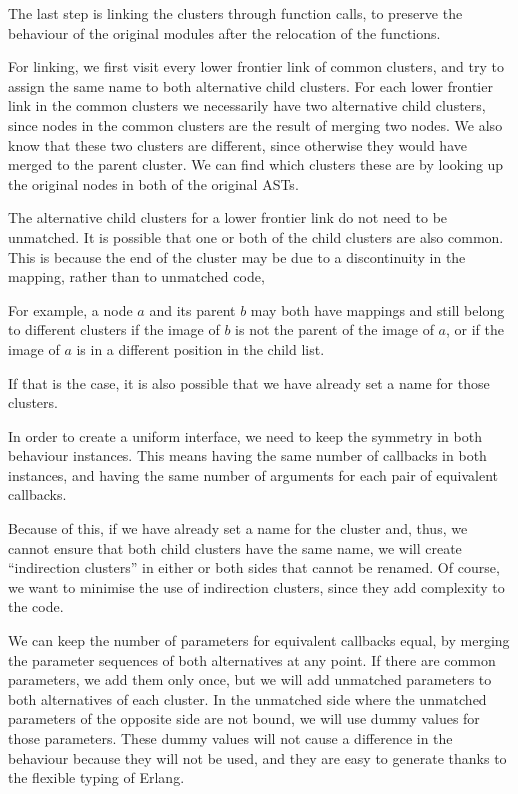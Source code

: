 The last step is linking the clusters through function calls, to preserve
the behaviour of the original modules after the relocation of the
functions.

For linking, we first visit every lower frontier link of common clusters,
and try to assign the same name to both alternative child clusters.
For each lower frontier link in the common clusters we necessarily have
two alternative child clusters, since nodes in the common clusters
are the result of merging two nodes. We also know that these two clusters
are different, since otherwise they would have merged to the parent
cluster. We can find which clusters these are by looking up the original
nodes in both of the original ASTs.

The alternative child clusters for a lower frontier link do not need to
be unmatched. It is possible that one or both of the child clusters
are also common. This is because the end of the cluster may be due
to a discontinuity in the mapping, rather than to unmatched code,

For example, a node $a$ and its parent $b$ may both have mappings and still
belong to different clusters if the image of $b$ is not the parent
of the image of $a$, or if the image of $a$ is in a different position
in the child list.

If that is the case, it is also possible that we have already set a
name for those clusters.

In order to create a uniform interface, we need to keep the symmetry
in both behaviour instances. This means having the same number of
callbacks in both instances, and having the same number of arguments
for each pair of equivalent callbacks.

Because of this, if we have already set a name for the cluster and,
thus, we cannot ensure that both child clusters have the same name,
we will create ``indirection clusters'' in either or both 
sides that cannot be renamed. Of course, we want
to minimise the use of indirection clusters, since they add complexity
to the code.

We can keep the number of parameters for equivalent callbacks equal,
by merging the parameter sequences of both alternatives at any point. If there
are common parameters, we add them only once, but we will add unmatched
parameters to both alternatives of each cluster. In the unmatched
side where the unmatched parameters of the opposite side are not bound,
we will use dummy values for those parameters. These dummy values
will not cause a difference in the behaviour because they will not
be used, and they are easy to generate thanks to the flexible typing
of Erlang.

